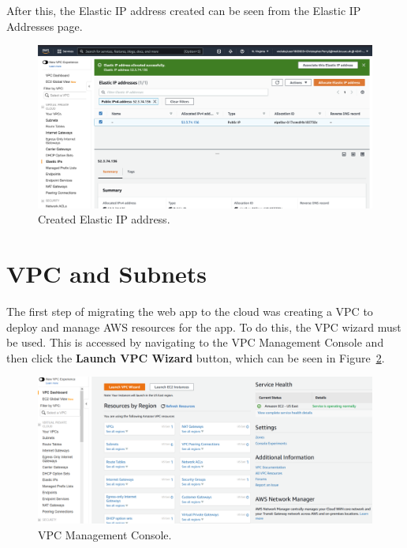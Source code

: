 After this, the Elastic IP address created can be seen from the Elastic IP Addresses page.

\begin{figure}[!htbp]
    \centering
    \includegraphics[width=\textwidth]{resources/vpc/elastic_ip_addresses}
    \caption{Created Elastic IP address.}
    \label{fig:elastic-ip-addresses}
\end{figure}

\clearpage
\section{VPC and Subnets}\label{sec:vpc-and-subnets}

The first step of migrating the web app to the cloud was creating a VPC to deploy and manage AWS resources for the app.
To do this, the VPC wizard must be used.
This is accessed by navigating to the VPC Management Console and then click the \textbf{Launch VPC Wizard} button, which
can be seen in Figure~\ref{fig:vpc-wizard}.

\begin{figure}[!htbp]
    \centering
    \includegraphics[width=\textwidth]{resources/vpc/vpc-dashboard}
    \caption{VPC Management Console.}
    \label{fig:vpc-wizard}
\end{figure}

